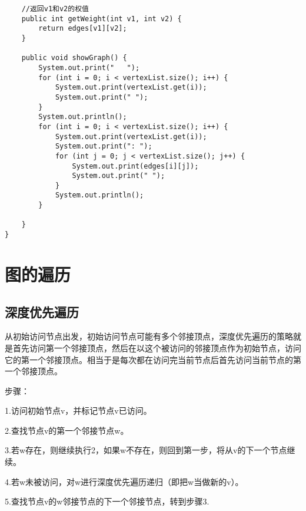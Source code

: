 \documentclass[a4paper]{report}
\begin{document}
\begin{lstlisting}
    //返回v1和v2的权值
    public int getWeight(int v1, int v2) {
        return edges[v1][v2];
    }

    public void showGraph() {
        System.out.print("   ");
        for (int i = 0; i < vertexList.size(); i++) {
            System.out.print(vertexList.get(i));
            System.out.print(" ");
        }
        System.out.println();
        for (int i = 0; i < vertexList.size(); i++) {
            System.out.print(vertexList.get(i));
            System.out.print(": ");
            for (int j = 0; j < vertexList.size(); j++) {
                System.out.print(edges[i][j]);
                System.out.print(" ");
            }
            System.out.println();
        }

    }
}
\end{lstlisting}
\section{图的遍历}
\subsection{深度优先遍历}
从初始访问节点出发，初始访问节点可能有多个邻接顶点，深度优先遍历的策略就是首先访问第一个邻接顶点，然后在以这个被访问的邻接顶点作为初始节点，访问它的第一个邻接顶点。相当于是每次都在访问完当前节点后首先访问当前节点的第一个邻接顶点。

步骤：

1.访问初始节点v，并标记节点v已访问。

2.查找节点v的第一个邻接节点w。

3.若w存在，则继续执行2，如果w不存在，则回到第一步，将从v的下一个节点继续。

4.若w未被访问，对w进行深度优先遍历递归（即把w当做新的v）。

5.查找节点v的w邻接节点的下一个邻接节点，转到步骤3.
\end{document}
